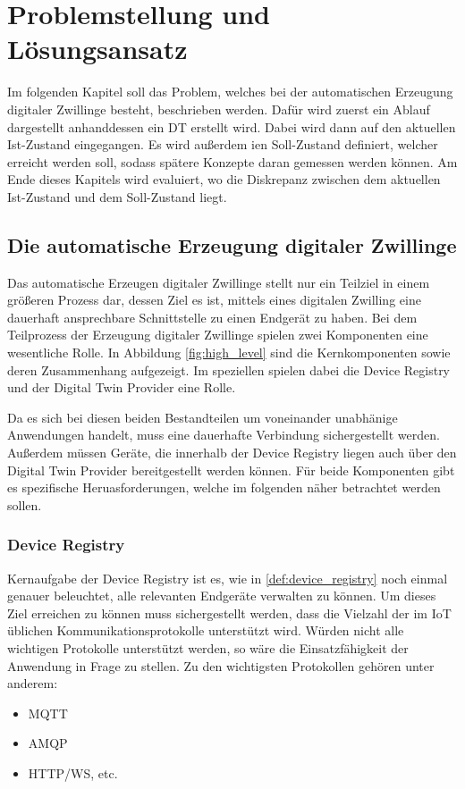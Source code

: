 \chapter{Problemstellung und Lösungsansatz}

Im folgenden Kapitel soll das Problem, welches bei der automatischen Erzeugung digitaler Zwillinge besteht, beschrieben werden. Dafür wird zuerst ein Ablauf dargestellt anhanddessen ein \ac{DT} erstellt wird. Dabei wird dann auf den aktuellen Ist-Zustand eingegangen. Es wird außerdem ien Soll-Zustand definiert, welcher erreicht werden soll, sodass spätere Konzepte daran gemessen werden können. Am Ende dieses Kapitels wird evaluiert, wo die Diskrepanz zwischen dem aktuellen Ist-Zustand und dem Soll-Zustand liegt.

\section{Die automatische Erzeugung digitaler Zwillinge}

Das automatische Erzeugen digitaler Zwillinge stellt nur ein Teilziel in einem größeren Prozess dar, dessen Ziel es ist, mittels eines digitalen Zwilling eine dauerhaft ansprechbare Schnittstelle zu einen Endgerät zu haben. Bei dem Teilprozess der Erzeugung digitaler Zwillinge spielen zwei Komponenten eine wesentliche Rolle. In Abbildung \vref{fig:high_level} sind die Kernkomponenten sowie deren Zusammenhang aufgezeigt. Im speziellen spielen dabei die Device Registry und der Digital Twin Provider eine Rolle.

Da es sich bei diesen beiden Bestandteilen um voneinander unabhänige Anwendungen handelt, muss eine dauerhafte Verbindung sichergestellt werden. Außerdem müssen Geräte, die innerhalb der Device Registry liegen auch über den Digital Twin Provider bereitgestellt werden können. Für beide Komponenten gibt es spezifische Heruasforderungen, welche im folgenden näher betrachtet werden sollen.

\subsection{Device Registry}

Kernaufgabe der Device Registry ist es, wie in \vref{def:device_registry} noch einmal genauer beleuchtet, alle relevanten Endgeräte verwalten zu können. Um dieses Ziel erreichen zu können muss sichergestellt werden, dass die Vielzahl der im \ac{IoT} üblichen Kommunikationsprotokolle unterstützt wird. Würden nicht alle wichtigen Protokolle unterstützt werden, so wäre die Einsatzfähigkeit der Anwendung in Frage zu stellen. Zu den wichtigsten Protokollen gehören unter anderem:
\begin{itemize}
    \item MQTT
    \item AMQP
    \item HTTP/WS, etc.
\end{itemize}

